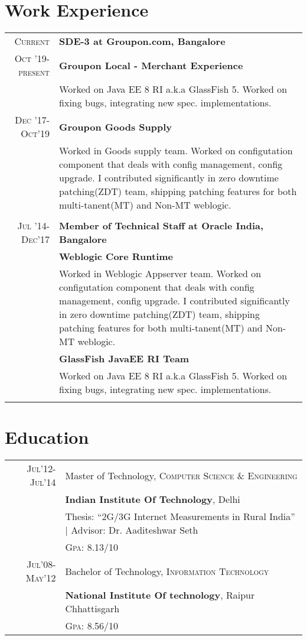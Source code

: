 \documentclass[a4paper,10pt]{article}
\begin{document}
\section{Work Experience}
\begin{tabular}{rp{15cm}}
 \textsc{Current} & \textbf{SDE-3 at Groupon.com, Bangalore} \\
 \textsc{Oct '19-present}&\textbf{Groupon Local - Merchant Experience} \\ &\normalsize{Worked on Java EE 8 RI a.k.a GlassFish 5. Worked on fixing bugs, integrating new spec. implementations.}\\ 
 \textsc{Dec '17-Oct'19}& \textbf{Groupon Goods Supply} \\ &\normalsize{Worked in Goods supply team. Worked on configutation component that deals with config management, config upgrade. I contributed significantly in zero downtime patching(ZDT) team, shipping patching features for both multi-tanent(MT) and Non-MT weblogic.} \\
  \multicolumn{2}{c}{} \\
 \textsc{Jul '14-Dec'17}& \textbf{Member of Technical Staff at Oracle India, Bangalore}\\
 &\textbf{Weblogic Core Runtime} \\ &\normalsize{Worked in Weblogic Appserver team. Worked on configutation component that deals with config management, config upgrade. I contributed significantly in zero downtime patching(ZDT) team, shipping patching features for both multi-tanent(MT) and Non-MT weblogic.} \\ 
 &\textbf{GlassFish JavaEE RI Team} \\ &\normalsize{Worked on Java EE 8 RI a.k.a GlassFish 5. Worked on fixing bugs, integrating new spec. implementations.}\\
 \multicolumn{2}{c}{} \\

\end{tabular}

\section{Education}
\begin{tabular}{rp{15cm}}	
\textsc{Jul'12-Jul'14} & Master of Technology, \textsc{Computer Science \& Engineering}\\
&\normalsize \textbf{Indian Institute Of Technology}, Delhi\\
& Thesis: ``2G/3G Internet Measurements in Rural India'' | \small Advisor: Dr. Aaditeshwar Seth\\
&\normalsize \textsc{Gpa}: 8.13/10\\
\textsc{Jul'08-May'12} & Bachelor of Technology, \textsc{Information Technology}\\
&\normalsize \textbf{National Institute Of technology}, Raipur Chhattisgarh\\
&\normalsize \textsc{Gpa}: 8.56/10\\
\end{tabular}
\end{document}
